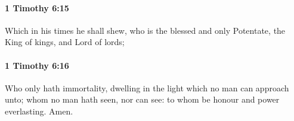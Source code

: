 		\paragraph{1 Timothy 6:15} %
			\label{1TIMOTHY-6-15}

			Which in his times he shall shew, who is the blessed and only Potentate, the King of kings, and Lord of lords;

			\begin{framed}
			\scriptsize
				\begin{compactdesc}
					\item[SBLG] 
				\end{compactdesc}
			\end{framed}

		\paragraph{1 Timothy 6:16} %
			\label{1TIMOTHY-6-16}

			Who only hath immortality, dwelling in the light which no man can approach unto; whom no man hath seen, nor can see: to whom be honour and power everlasting.  Amen.

